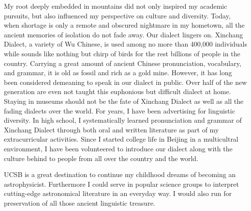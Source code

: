 \documentclass[11pt, a4paper]{awesome-cv} %
\begin{document}
\begin{cvletter}
My root deeply embedded in mountains did not only inspired my academic pursuits, but also influenced my perspective on culture and diversity. Today, when shortage is only a remote and obscured nightmare in my hometown, all the ancient memories of isolation do not fade away. Our dialect lingers on. Xinchang Dialect, a variety of Wu Chinese, is used among no more than 400,000 individuals while sounds like nothing but chirp of birds for the rest billions of people in the country. Carrying a great amount of ancient Chinese pronunciation, vocabulary, and grammar, it is old as fossil and rich as a gold mine. However, it has long been considered demeaning to speak in our dialect in public. Over half of the new generation are even not taught this euphonious but difficult dialect at home. Staying in museums should not be the fate of Xinchang Dialect as well as all the fading dialects over the world. For years, I have been advertising for linguistic diversity. In high school, I systematically learned pronunciation and grammar of Xinchang Dialect through both oral and written literature as part of my extracurricular activities. Since I started college life in Beijing in a multicultral environment, I have been volunteered to introduce our dialect along with the culture behind to people from all over the country and the world. 

UCSB is a great destination to continue my childhood dreams of becoming an astrophysicist. Furthermore I could serve in popular science groups to interpret cutting-edge astronomical literature in an everyday way. I would also run for preservation of all those ancient linguistic treasure.


\end{cvletter}


\end{document}
